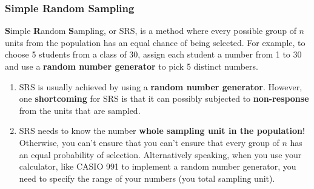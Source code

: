 \documentclass[math,code]{amznotes}
\theoremstyle{remark}
\begin{document}
\subsubsection{Simple Random Sampling}
\textbf{S}imple \textbf{R}andom \textbf{S}ampling, or SRS, is a method where every possible group of $n$ units from the population has an equal chance of being selected. For example, to choose 5 students from a class of 30, assign each student a number from 1 to 30 and use a \textbf{random number generator} to pick 5 distinct numbers.
\begin{notebox}
    \begin{enumerate}
        \item SRS is usually achieved by using a \textbf{random number generator}. However, one \textbf{shortcoming} for SRS is that it can possibly subjected to \textbf{non-response} from the units that are sampled.
        \item SRS needs to know the number \textbf{whole sampling unit in the population}! Otherwise, you can't ensure that you can't ensure that every group of $n$ has an equal probability of selection. Alternatively speaking, when you use your calculator, like CASIO 991 to implement a random number generator, you need to specify the range of your numbers (you total sampling unit).
    \end{enumerate}
\end{notebox}
\end{document}
